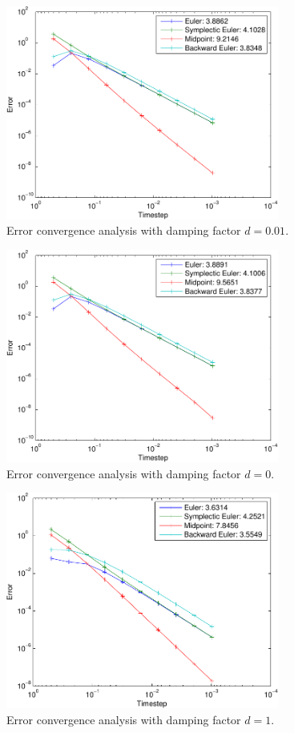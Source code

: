 \begin{figure}
	\centering
		\includegraphics*[width=0.8\textwidth]{../data/ex1/errorConvergenceDamp0_01-crop.pdf}
	\caption{Error convergence analysis with damping factor $d=0.01$.}
	\label{fig:errorconvd001} 
\end{figure}
\begin{figure}
	\centering
		\includegraphics*[width=0.8\textwidth]{../data/ex1/errorConvergenceDamp0-crop.pdf}
	\caption{Error convergence analysis with damping factor $d=0$.}
	\label{fig:errorconvd0} 
\end{figure}
\begin{figure}
	\centering
		\includegraphics*[width=0.8\textwidth]{../data/ex1/errorConvergenceDamp1-crop.pdf}
	\caption{Error convergence analysis with damping factor $d=1$.}
	\label{fig:errorconvd19} 
\end{figure}


